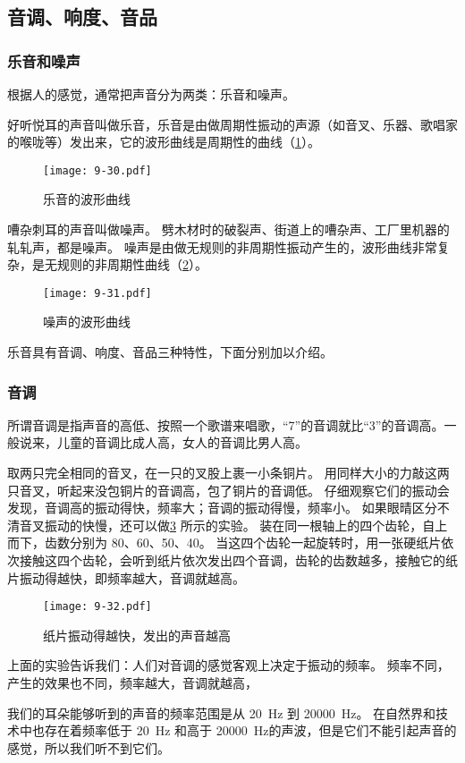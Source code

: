 \subsection{音调、响度、音品}
\subsubsection{乐音和噪声}
根据人的感觉，通常把声音分为两类：乐音和噪声。

好听悦耳的声音叫做乐音，乐音是由做周期性振动的声源（如音叉、乐器、歌唱家的喉咙等）发出来，它的波形曲线是周期性的曲线（\cref{fig:9-30}）。
\begin{figure}
  \texttt{[image: 9-30.pdf]}
  \caption{乐音的波形曲线}\label{fig:9-30}
\end{figure}

嘈杂刺耳的声音叫做噪声。
劈木材时的破裂声、街道上的嘈杂声、工厂里机器的轧轧声，都是噪声。
噪声是由做无规则的非周期性振动产生的，波形曲线非常复杂，是无规则的非周期性曲线（\cref{fig:9-31}）。
\begin{figure}
  \texttt{[image: 9-31.pdf]}
  \caption{噪声的波形曲线}\label{fig:9-31}
\end{figure}

乐音具有音调、响度、音品三种特性，下面分别加以介绍。

\subsubsection{音调}
所谓音调是指声音的高低、按照一个歌谱来唱歌，“7”的音调就比“3”的音调高。一般说来，儿童的音调比成人高，女人的音调比男人高。

取两只完全相同的音叉，在一只的叉股上裹一小条铜片。
用同样大小的力敲这两只音叉，听起来没包铜片的音调高，包了铜片的音调低。
仔细观察它们的振动会发现，音调高的振动得快，频率大；音调的振动得慢，频率小。
如果眼晴区分不清音叉振动的快慢，还可以做\cref{fig:9-32} 所示的实验。
装在同一根轴上的四个齿轮，自上而下，齿数分别为 80、60、50、40。
当这四个齿轮一起旋转时，用一张硬纸片依次接触这四个齿轮，会听到纸片依次发出四个音调，齿轮的齿数越多，接触它的纸片振动得越快，即频率越大，音调就越高。
\begin{figure}
  \texttt{[image: 9-32.pdf]}
  \caption{纸片振动得越快，发出的声音越高}\label{fig:9-32}
\end{figure}

上面的实验告诉我们：人们对音调的感觉客观上决定于振动的频率。
频率不同，产生的效果也不同，频率越大，音调就越高，

我们的耳朵能够听到的声音的频率范围是从 \qty{20}{Hz} 到 \qty{20000}{Hz}。
在自然界和技术中也存在着频率低于 \qty{20}{Hz} 和高于 \qty{20000}{Hz}的声波，但是它们不能引起声音的感觉，所以我们听不到它们。

